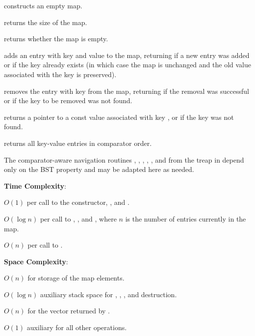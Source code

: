 \begin{compactitem}
  \item {} constructs an empty map.
  \item {} returns the size of the map.
  \item {} returns whether the map is empty.
  \item {} adds an entry with key  and value  to the map, returning  if a new entry was added or  if the key already exists (in which case the map is unchanged and the old value associated with the key is preserved).
  \item {} removes the entry with key  from the map, returning  if the removal was successful or  if the key to be removed was not found.
  \item {} returns a pointer to a const value associated with key , or  if the key was not found.
  \item {} returns all key-value entries in comparator order.
\end{compactitem}

The comparator-aware navigation routines , , , , , and  from the treap in  depend only on the BST property and may be adapted here as needed.

\textbf{Time Complexity}:
\begin{compactitem}
  \item $O(1)$ per call to the constructor, , and .
  \item $O(\log n)$ per call to , , and , where $n$ is the number of entries currently in the map.
  \item $O(n)$ per call to .
\end{compactitem}

\textbf{Space Complexity}:
\begin{compactitem}
  \item $O(n)$ for storage of the map elements.
  \item $O(\log n)$ auxiliary stack space for , , , and destruction.
  \item $O(n)$ for the vector returned by .
  \item $O(1)$ auxiliary for all other operations.
\end{compactitem}

